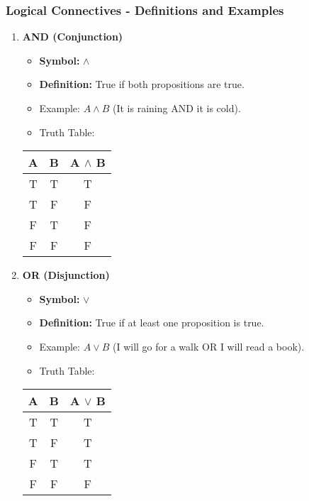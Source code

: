 \documentclass[aspectratio=169]{beamer}
\begin{document}
\begin{frame}[fragile]
    \frametitle{Logical Connectives - Definitions and Examples}
    \begin{enumerate}
        \item \textbf{AND (Conjunction)} 
        \begin{itemize}
            \item \textbf{Symbol:} $\land$ 
            \item \textbf{Definition:} True if both propositions are true.
            \item Example: $A \land B$ (It is raining AND it is cold).
            \item Truth Table:
        \end{itemize}
        \begin{center}
            \begin{tabular}{|c|c|c|}
                \hline
                A & B & A $\land$ B \\
                \hline
                T & T & T \\
                T & F & F \\
                F & T & F \\
                F & F & F \\
                \hline
            \end{tabular}
        \end{center}
        
        \item \textbf{OR (Disjunction)} 
        \begin{itemize}
            \item \textbf{Symbol:} $\lor$
            \item \textbf{Definition:} True if at least one proposition is true.
            \item Example: $A \lor B$ (I will go for a walk OR I will read a book).
            \item Truth Table:
        \end{itemize}
        \begin{center}
            \begin{tabular}{|c|c|c|}
                \hline
                A & B & A $\lor$ B \\
                \hline
                T & T & T \\
                T & F & T \\
                F & T & T \\
                F & F & F \\
                \hline
            \end{tabular}
        \end{center}
    \end{enumerate}
\end{frame}
\end{document}
